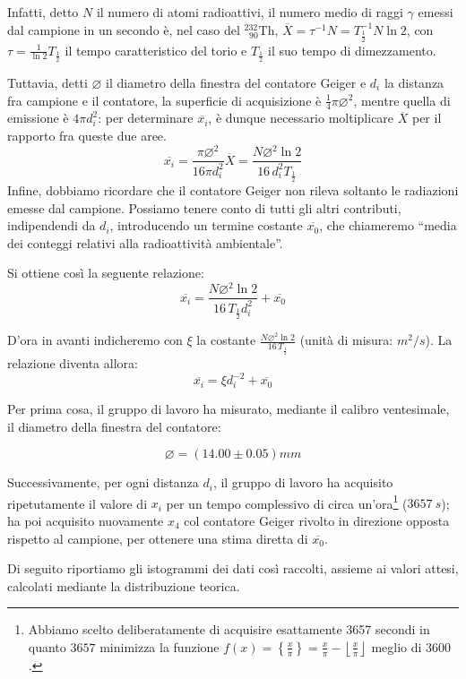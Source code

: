 \documentclass{article}
\newcommand*{\diam}{\varnothing}
\newcommand*{\Th}{^{232}_{\;\;90} \text{Th}}
\begin{document}
Infatti, detto $N$ il numero di atomi radioattivi,
il numero medio di raggi $\gamma$ emessi dal campione in un secondo
è, nel caso del $\Th$, $\overline{X} = \tau^{-1}N = {T^{-1}_\frac{1}{2}}N\ln{2}$,
con $\tau=\frac{1}{\ln{2}}T_\frac{1}{2}$ il tempo caratteristico del torio e
$T_\frac{1}{2}$ il suo tempo di dimezzamento.

Tuttavia, detti $\diam$ il diametro della finestra del contatore Geiger e
$d_i$ la distanza fra campione e il contatore,
la superficie di acquisizione è $\frac{1}{4}\pi\diam^2$,
mentre quella di emissione è $4\pi d_i^2$: per determinare $\overline{x_i}$,
è dunque necessario moltiplicare $\overline{X}$ per il rapporto fra queste due
aree.
\[
    \overline{x_i} = \frac{\pi \diam^2}{16\pi d_i^2} \overline{X} =
    \frac{N\diam^2\ln{2}}{16\,d_i^2 T_\frac{1}{2}}
\]
Infine, dobbiamo ricordare che il contatore Geiger non rileva soltanto le
radiazioni emesse dal campione. Possiamo tenere conto di tutti gli altri
contributi, indipendendi da $d_i$, introducendo un termine costante
$\overline{x_0}$, che chiameremo
“media dei conteggi relativi alla radioattività ambientale”.

Si ottiene così la seguente relazione:
\[\overline{x_i} = \frac{N\diam^2\ln{2}}{16\,T_\frac{1}{2}d_i^2} + \overline{x_0}\]

D'ora in avanti indicheremo con $\xi$ la costante $\frac{N\diam^2\ln{2}}{16\,T_\frac{1}{2}}$
(unità di misura: $\unit{m^2\per s}$).
La relazione diventa allora:
\[\overline{x_i} = \xi d_i^{-2} + \overline{x_0}\]

Per prima cosa, il gruppo di lavoro ha misurato, mediante il calibro ventesimale,
il diametro della finestra del contatore:

\[\diam = (14.00\pm0.05)\unit{mm}\]

Successivamente, per ogni distanza $d_i$, il gruppo di lavoro ha acquisito
ripetutamente il valore di $x_i$ per un tempo complessivo di circa un'ora\footnote{
    Abbiamo scelto deliberatamente di acquisire esattamente 3657 secondi in quanto
    $3657$ minimizza la funzione
    $f(x)=\left\{\frac{x}{\pi}\right\}=\frac{x}{\pi} - \left\lfloor\frac{x}{\pi}\right\rfloor$
    meglio di $3600$.
} ($\qty{3657}{s}$); ha poi acquisito nuovamente $x_4$ col contatore Geiger rivolto in
direzione opposta rispetto al campione, per ottenere una stima diretta di $\overline{x_0}$.

Di seguito riportiamo gli istogrammi dei dati così raccolti,
assieme ai valori attesi, calcolati mediante la distribuzione teorica.
\end{document}
